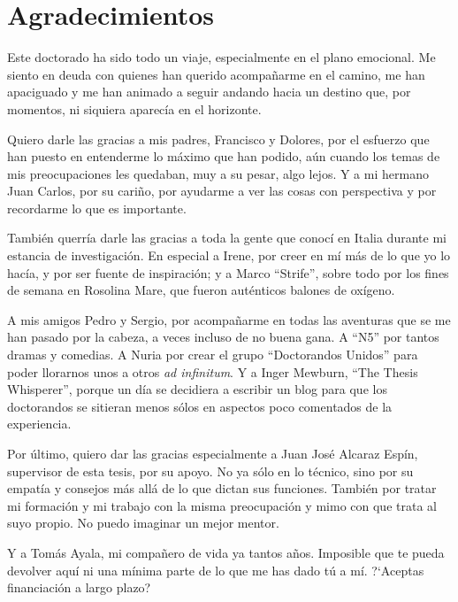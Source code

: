 \section*{Agradecimientos}
Este doctorado ha sido todo un viaje, especialmente en el plano emocional. Me siento en deuda con quienes han querido acompa\~{n}arme en el camino, me han apaciguado y me han animado a seguir andando hacia un destino que, por momentos, ni siquiera aparec\'{i}a en el horizonte.

Quiero darle las gracias a mis padres, Francisco y Dolores, por el esfuerzo que han puesto en entenderme lo m\'{a}ximo que han podido, a\'{u}n cuando los temas de mis preocupaciones les quedaban, muy a su pesar, algo lejos. Y a mi hermano Juan Carlos, por su cari\~{n}o, por ayudarme a ver las cosas con perspectiva y por recordarme lo que es importante. 

Tambi\'{e}n querr\'{i}a darle las gracias a toda la gente que conoc\'{i} en Italia durante mi estancia de investigaci\'{o}n. En especial a Irene, por creer en m\'{i} m\'{a}s de lo que yo lo hac\'{i}a, y por ser fuente de inspiraci\'{o}n; y a Marco \enquote{Strife}, sobre todo por los fines de semana en Rosolina Mare, que fueron aut\'{e}nticos balones de ox\'{i}geno. 

A mis amigos Pedro y Sergio, por acompa\~{n}arme en todas las aventuras que se me han pasado por la cabeza, a veces incluso de no buena gana. A \enquote{N5} por tantos dramas y comedias. A Nuria por crear el grupo \enquote{Doctorandos Unidos} para poder llorarnos unos a otros \textit{ad infinitum}. Y a Inger Mewburn, \enquote{The Thesis Whisperer}, porque un d\'{i}a se decidiera a escribir un blog para que los doctorandos se sitieran menos s\'{o}los en aspectos poco comentados de la experiencia. 

Por \'{u}ltimo, quiero dar las gracias especialmente a Juan Jos\'{e} Alcaraz Esp\'{i}n, supervisor de esta tesis, por su apoyo. No ya s\'{o}lo en lo t\'{e}cnico, sino por su empat\'{i}a y consejos m\'{a}s all\'{a} de lo que dictan sus funciones. Tambi\'{e}n por tratar mi formaci\'{o}n y mi trabajo con la misma preocupaci\'{o}n y mimo con que trata al suyo propio. No puedo imaginar un mejor mentor. 

Y a Tom\'{a}s Ayala, mi compa\~{n}ero de vida ya tantos a\~{n}os. Imposible que te pueda devolver aqu\'{i} ni una m\'{i}nima parte de lo que me has dado t\'{u} a m\'{i}. ?`Aceptas financiaci\'{o}n a largo plazo? 


